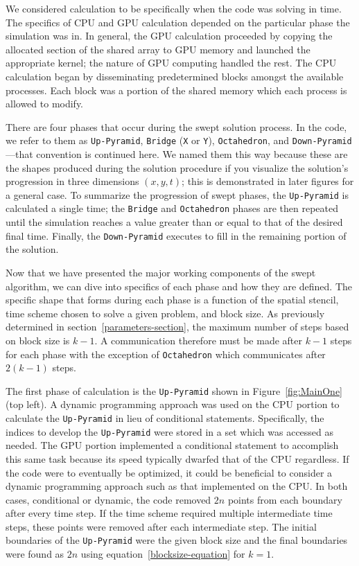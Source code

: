 \documentclass[preprints,article,accept,moreauthors,pdftex]{Definitions/mdpi}
\def\Up{\texttt{Up-Pyramid}}
\def\Down{\texttt{Down-Pyramid}}
\def\Oct{\texttt{Octahedron}}
\begin{document}
 \par
 We considered calculation to be specifically when the code was solving in time. The specifics of CPU and GPU calculation depended on the particular phase the simulation was in. In general, the GPU calculation proceeded by copying the allocated section of the shared array to GPU memory and launched the appropriate kernel; the nature of GPU computing handled the rest. The CPU calculation began by disseminating predetermined blocks amongst the available processes. Each block was a portion of the shared memory which each process is allowed to modify.
 
\par
There are four phases that occur during the swept solution process. In the code, we refer to them as \Up{}, \texttt{Bridge} (\texttt{X} or \texttt{Y}), \Oct{}, and \Down{}---that convention is continued here. We named them this way because these are the shapes produced during the solution procedure if you visualize the solution's progression in three dimensions $(x,y,t)$; this is demonstrated in later figures for a general case. To summarize the progression of swept phases, the \Up{} is calculated a single time; the \texttt{Bridge} and \Oct{} phases are then repeated until the simulation reaches a value greater than or equal to that of the desired final time. Finally, the \Down{} executes to fill in the remaining portion of the solution. 

\par
Now that we have presented the major working components of the swept algorithm, we can dive into specifics of each phase and how they are defined. The specific shape that forms during each phase is a function of the spatial stencil, time scheme chosen to solve a given problem, and block size. As previously determined in section~\ref{parameters-section}, the maximum number of steps based on block size is $k-1$. A communication therefore must be made after $k-1$ steps for each phase with the exception of \Oct{} which communicates after $2(k-1)$ steps.
 
\par
The first phase of calculation is the \Up{} shown in Figure~\ref{fig:MainOne} (top left). A dynamic programming approach was used on the CPU portion to calculate the \Up{} in lieu of conditional statements. Specifically, the indices to develop the \Up{} were stored in a set which was accessed as needed. The GPU portion implemented a conditional statement to accomplish this same task because its speed typically dwarfed that of the CPU regardless. If the code were to eventually be optimized, it could be beneficial to consider a dynamic programming approach such as that implemented on the CPU. In both cases, conditional or dynamic, the code removed $2n$ points from each boundary after every time step. If the time scheme required multiple intermediate time steps, these points were removed after each intermediate step. The initial boundaries of the \Up{} were the given block size and the final boundaries were found as $2n$ using equation~\ref{blocksize-equation} for $k=1$.
\end{document}
